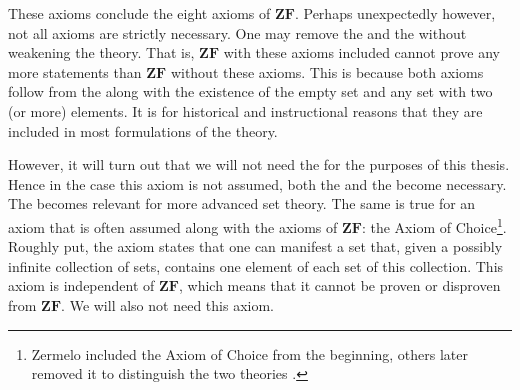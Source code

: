 \documentclass[../main.tex]{subfiles}
\begin{document}
These axioms conclude the eight axioms of $\mathbf{ZF}$. Perhaps unexpectedly however, not all axioms are strictly necessary. One may remove the  and the  without weakening the theory. That is, $\mathbf{ZF}$ with these axioms included cannot prove any more statements than $\mathbf{ZF}$ without these axioms. This is because both axioms follow from the  along with the existence of the empty set and any set with two (or more) elements. It is for historical and instructional reasons that they are included in most formulations of the theory.

However, it will turn out that we will not need the  for the purposes of this thesis. Hence in the case this axiom is not assumed, both the  and the  become necessary. The  becomes relevant for more advanced set theory. The same is true for an axiom that is often assumed along with the axioms of $\mathbf{ZF}$: the Axiom of Choice\footnote{Zermelo included the Axiom of Choice from the beginning, others later removed it to distinguish the two theories \cite{Zermelo1908}.}. Roughly put, the axiom states that one can manifest a set that, given a possibly infinite collection of sets, contains one element of each set of this collection. This axiom is independent of $\mathbf{ZF}$, which means that it cannot be proven or disproven from $\mathbf{ZF}$. We will also not need this axiom.
\end{document}
